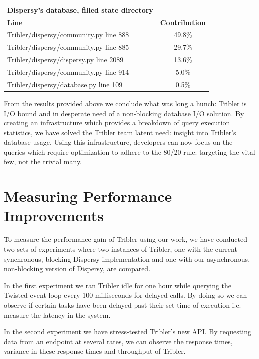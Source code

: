 \begin{table}[!h]
{\begin{tabular}{|l|c|}
		 & \\ \hline
		\textbf{Dispersy's database, filled state directory} & \\ \hline
		\textbf{Line} & \textbf{Contribution} \\ \hline
		Tribler/dispersy/community.py line 888 & 49.8\% \\ \hline
		Tribler/dispersy/community.py line 885 & 29.7\% \\ \hline
		Tribler/dispersy/dispersy.py line 2089 & 13.6\% \\ \hline
		Tribler/dispersy/community.py line 914 & 5.0\% \\ \hline
		Tribler/dispersy/database.py line 109 & 0.5\% \\ \hline
	\end{tabular}}
\end{table}

From the results provided above we conclude what was long a hunch: Tribler is I/O bound and in desperate need of a non-blocking database I/O solution.
By creating an infrastructure which provides a breakdown of query execution statistics, we have solved the Tribler team latent need: insight into Tribler's database usage.
Using this infrastructure, developers can now focus on the queries which require optimization to adhere to the 80/20 rule: targeting the vital few, not the trivial many.

\clearpage

\section{Measuring Performance Improvements}
\label{sct:tribler_performance_regression}

To measure the performance gain of Tribler using our work, we have conducted two sets of experiments where two instances of Tribler, one with the current synchronous, blocking Dispersy implementation and one with our asynchronous, non-blocking version of Dispersy, are compared.

In the first experiment we ran Tribler idle for one hour while querying the Twisted event loop every 100 milliseconds for delayed calls.
By doing so we can observe if certain tasks have been delayed past their set time of execution i.e. measure the latency in the system.

In the second experiment we have stress-tested Tribler's new API.
By requesting data from an endpoint at several rates, we can observe the response times, variance in these response times and throughput of Tribler.

